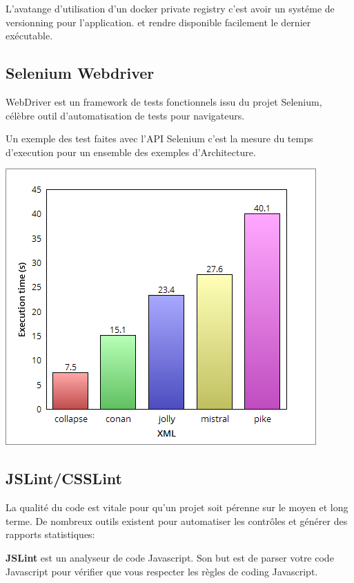 \documentclass [a4paper,11pt]{article}
\begin{document}
L'avatange d'utilisation d'un docker private registry c'est avoir un systéme de versionning pour l'application. et rendre disponible facilement le dernier exécutable.
\subsection{Selenium Webdriver}
WebDriver est un framework de tests fonctionnels issu du projet Selenium, célèbre outil d'automatisation de tests pour navigateurs.\newline

Un exemple des test faites avec l'API Selenium c'est la mesure du temps d'execution pour un ensemble des exemples d'Architecture.

\begin{center}
\includegraphics[scale=0.4]{img/benchmark.png}
\end{center}

\subsection{JSLint/CSSLint}

La qualité du code est vitale pour qu'un projet soit pérenne sur le moyen et long terme. De nombreux outils existent pour automatiser les contrôles et générer des rapports statistiques:\newline

\textbf{JSLint} est un analyseur de code Javascript. Son but est de parser votre code Javascript pour vérifier que vous respecter les règles de coding Javascript.\newline
\end{document}
